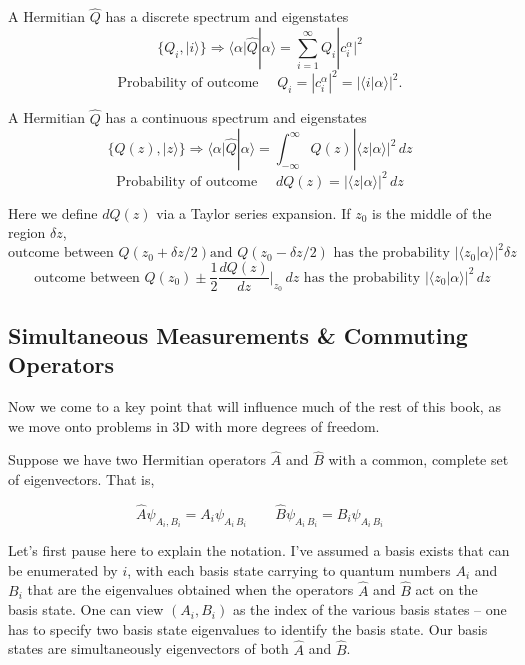 \begin{subbox}{}
  A Hermitian $\hat{Q}$ has a discrete spectrum and eigenstates \[ \{Q_i,
  |i\rangle\} \Rightarrow \langle \alpha | \hat{Q} | \alpha \rangle 
  = \sum_{i=1}^{\infty}  Q_i |c_i^\alpha|^2\] \[ \text{Probability of outcome
    } \quad Q_i
  = |c_i^\alpha|^2 = |\langle i | \alpha \rangle |^2. \] 

  A Hermitian $\hat{Q}$ has a continuous spectrum and eigenstates \[\{Q(z),
  |z\rangle\} \Rightarrow \langle \alpha | \hat{Q} | \alpha \rangle
= \int_{-\infty}^{\infty} Q(z)|\langle z | \alpha \rangle |^2 \, dz\] 
  \[ \text{Probability of outcome } \quad  dQ(z) = |\langle z | \alpha \rangle
  |^2 \, dz \]
\end{subbox}

Here we define $dQ(z)$ via a Taylor series expansion. If $z_0$ is the middle of
the region $\delta z$, \[ \text{outcome between } Q(z_0 + \delta z / 2) \text{
  and }
  Q(z_0 - \delta z / 2) \text{ has the probability } |\langle z_0 | \alpha \rangle |^2
  \delta z\] \[ \text{ outcome between } Q(z_0) \pm \frac{1}{2}
  \frac{dQ(z)}{dz}\Bigg|_{z_0} \, dz \text{ has the probability } |\langle z_0 | \alpha
\rangle |^2 \, dz\] 



\subsection{Simultaneous Measurements \& Commuting Operators} 




Now we come to a key point that will influence much of the rest of this book,
as we move onto problems in 3D with more degrees of freedom. 

Suppose we have two Hermitian operators $\hat{A}$ and $\hat{B}$ with a common,
complete set of eigenvectors. That is, 

\[
  \hat{A} \psi_{A_i, B_i} = A_i \psi_{A_i \, B_i} \qquad \hat{B}\psi_{A_i \,
  B_i} = B_i \psi_{A_i \, B_i}
\] \vspace{3px}

Let's first pause here to explain the notation. I've assumed a basis exists
that can be enumerated by $i$, with each basis state carrying to quantum
numbers $A_i$ and $B_i$ that are the eigenvalues obtained when the operators
$\hat{A} $ and $\hat{B}$ act on the basis state. One can view $(A_i, B_i)$ as
the index of the various basis states -- one has to specify two basis state
eigenvalues to identify the basis state. Our basis states are simultaneously
eigenvectors of both  $\hat{A}$ and $\hat{B}$. 


